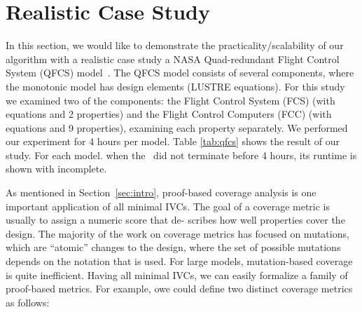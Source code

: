 \section{Realistic Case Study}

\label{sec:qfc}
In this section, we would like to demonstrate the practicality/scalability of our algorithm with a realistic case study a NASA Quad-redundant Flight Control System (QFCS) model~\cite{NFM2015:backes}. %
The QFCS model consists of several components, where the monotonic model has  design elements (LUSTRE equations). For this study we examined two of the components: the Flight Control System (FCS) (with  equations and 2 properties) and the Flight Control Computers (FCC) (with  equations and 9 properties), examining each property separately. We performed our experiment for 4 hours per model. Table \ref{tab:qfcs} shows the result of our study. For each model. when the \aivcalg\ did not terminate before 4 hours, its runtime is shown with incomplete. 

As mentioned in Section~\ref{sec:intro}, proof-based coverage analysis is one important application of all minimal IVCs. The goal of a
coverage metric is usually to assign a numeric score that de-
scribes how well properties cover the design. The majority of
the work on coverage metrics has focused on mutations, which
are “atomic” changes to the design, where the set of possible
mutations depends on the notation that is used. For large models, mutation-based coverage is quite inefficient. Having all minimal IVCs, we can easily formalize a family of proof-based metrics. For example, owe could define two distinct coverage metrics as follows:


